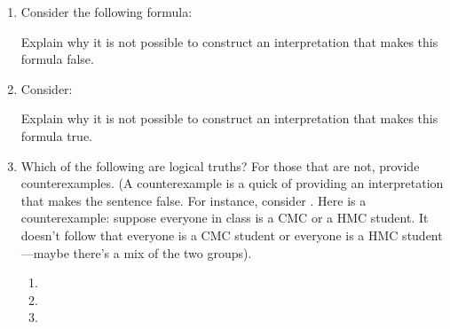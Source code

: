 \begin{enumerate}
{ }

\item Consider the following formula:


 Explain why it is not possible to construct an interpretation that makes this formula 
 false.


\item Consider:


 Explain why it is not possible to construct an interpretation that makes this formula 
 true.





\item Which of the following are logical truths? For those that are not,
  provide counterexamples. (A counterexample is a quick of providing an interpretation 
  that makes the sentence false. For instance, consider . Here is a counterexample: suppose everyone in class is a 
  CMC or a HMC student. It doesn't follow that everyone is a CMC student or 
  everyone is a HMC student---maybe there's a mix of the two groups).

 \begin{enumerate}



 \item {}
   
  \item {}
   
  \item {}
   

\end{enumerate}
\end{enumerate}

